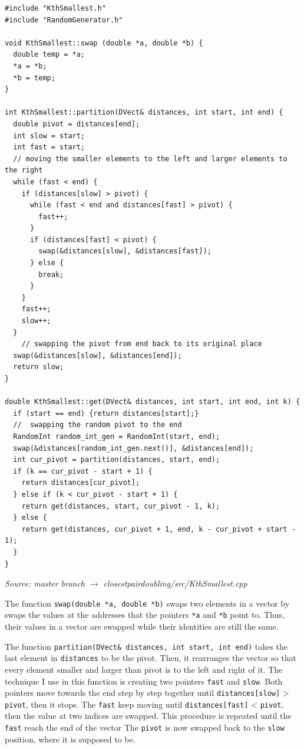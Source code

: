 \documentclass[12pt,english,]{article}
\newcommand{\code}[1]{\colorbox{lbcolor}{\texttt{#1}}}
\begin{document}
\begin{lstlisting}
#include "KthSmallest.h"
#include "RandomGenerator.h"

void KthSmallest::swap (double *a, double *b) {
  double temp = *a;
  *a = *b;
  *b = temp;
}

int KthSmallest::partition(DVect& distances, int start, int end) {
  double pivot = distances[end];
  int slow = start;
  int fast = start;
  // moving the smaller elements to the left and larger elements to the right
  while (fast < end) {
    if (distances[slow] > pivot) {
      while (fast < end and distances[fast] > pivot) {
        fast++;
      }
      if (distances[fast] < pivot) {
        swap(&distances[slow], &distances[fast]);
      } else {
        break;
      }
    }
    fast++;
    slow++;
  }
    // swapping the pivot from end back to its original place
  swap(&distances[slow], &distances[end]);
  return slow;
}

double KthSmallest::get(DVect& distances, int start, int end, int k) {
  if (start == end) {return distances[start];}
  //  swapping the random pivot to the end
  RandomInt random_int_gen = RandomInt(start, end);
  swap(&distances[random_int_gen.next()], &distances[end]);
  int cur_pivot = partition(distances, start, end);
  if (k == cur_pivot - start + 1) {
    return distances[cur_pivot];
  } else if (k < cur_pivot - start + 1) {
    return get(distances, start, cur_pivot - 1, k);
  } else {
    return get(distances, cur_pivot + 1, end, k - cur_pivot + start - 1);
  }
}

\end{lstlisting}
\vspace{-2truemm}
\begin{minipage}{1\textwidth}
  \begin{flushright}
  {\footnotesize \emph{Source: master branch $\rightarrow$ closestpairdoubling/src/KthSmallest.cpp}\par}
  \end{flushright}
\end{minipage}
\vspace{0.5truemm}

The function \code{swap(double *a, double *b)} swaps two elements in a
vector by swaps the values at the addresses that the pointers \code{*a}
and \code{*b} point to. Thus, their values in a vector are swapped while
their identities are still the same.

The function \code{partition(DVect\& distances, int start, int end)}
takes the last element in \code{distances} to be the pivot. Then, it
rearranges the vector so that every element smaller and larger than
pivot is to the left and right of it. The technique I use in this
function is creating two pointers \code{fast} and \code{slow}. Both
pointers move towards the end step by step together until
\code{distances[slow]} \textgreater{} \code{pivot}, then it stops. The
\code{fast} keep moving until \code{distances[fast]} \textless{}
\code{pivot}, then the value at two indices are swapped. This procedure
is repeated until the \code{fast} reach the end of the vector The
\code{pivot} is now swapped back to the \code{slow} position, where it
is supposed to be.
\end{document}
